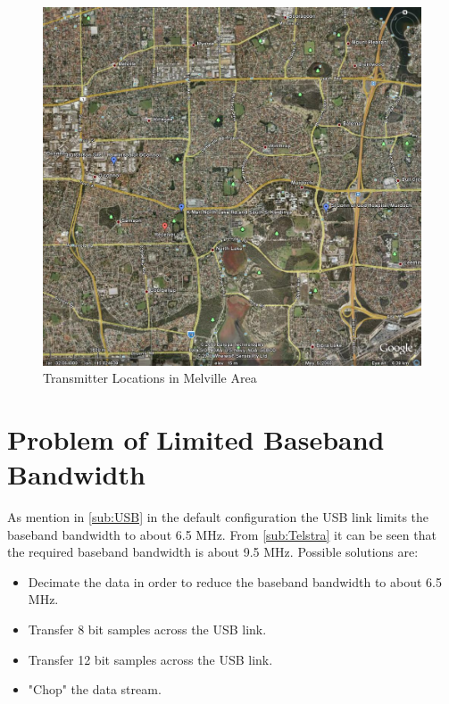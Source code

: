 \documentclass[a4paper]{report}
\numberwithin{equation}{chapter}
\begin{document}
\begin{figure}
\centering 
\includegraphics[scale=0.35]{Melville-Transmitter-Locations.jpg}
\caption[Transmitter Locations in Melville Area]{Transmitter Locations in Melville Area}
\label{fig:xmitter-Melville}
\end{figure}

\section[Problem of Limited Baseband Bandwidth]{Problem of Limited Baseband Bandwidth}

As mention in \ref{sub:USB} in the default configuration the USB link limits the baseband bandwidth to about 6.5 MHz. From \ref{sub:Telstra} it can be seen that the required baseband bandwidth is about 9.5 MHz. Possible solutions are:

\begin{itemize}
\item{Decimate the data in order to reduce the baseband bandwidth to about 6.5 MHz.}
\item{Transfer 8 bit samples across the USB link.}
\item{Transfer 12 bit samples across the USB link.}
\item{"Chop" the data stream.}
\end{itemize}

\bigskip
\end{document}
